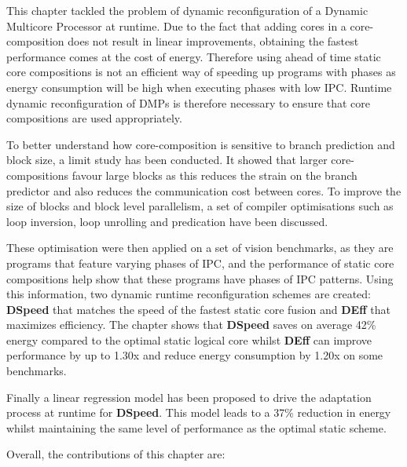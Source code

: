 This chapter tackled the problem of dynamic reconfiguration of a Dynamic Multicore Processor at runtime.
Due to the fact that adding cores in a core-composition does not result in linear improvements, obtaining the fastest performance comes at the cost of energy.
Therefore using ahead of time static core compositions is not an efficient way of speeding up programs with phases as energy consumption will be high when executing phases with low IPC. %
Runtime dynamic reconfiguration of DMPs is therefore necessary to ensure that core compositions are used appropriately.

To better understand how core-composition is sensitive to branch prediction and block size, a limit study has been conducted.
It showed that larger core-compositions favour large blocks as this reduces the strain on the branch predictor and also reduces the communication cost between cores.
To improve the size of blocks and block level parallelism, a set of compiler optimisations such as loop inversion, loop unrolling and predication have been discussed.

These optimisation were then applied on a set of vision benchmarks, as they are programs that feature varying phases of IPC, and the performance of static core compositions help show that these programs have phases of IPC patterns.
Using this information, two dynamic runtime reconfiguration schemes are created:  \textbf{DSpeed} that matches the speed of the fastest static core fusion and \textbf{DEff} that maximizes efficiency.
The chapter shows that \textbf{DSpeed} saves on average 42\% energy compared to the optimal static logical core whilst \textbf{DEff} can improve performance by up to 1.30x and reduce energy consumption by 1.20x on some benchmarks.

Finally a linear regression model has been proposed to drive the adaptation process at runtime for \textbf{DSpeed}.
This  model leads to a 37\% reduction in energy whilst maintaining the same level of performance as the optimal static scheme.

Overall, the contributions of this chapter are:

